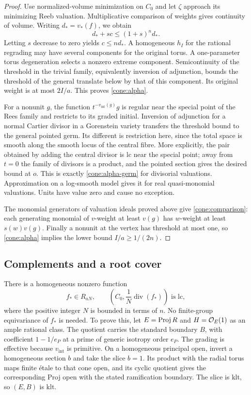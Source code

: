 \begin{proof}
Use normalized-volume minimization on $C_0$ and let $\zeta$ approach its
minimizing Reeb valuation.  Multiplicative comparison of weights gives
continuity of volume.  Writing $d_*=v_*(f)$, we obtain
\[
 d_*+sc\leq(1+s)^n d_*.
\]
Letting $s$ decrease to zero yields $c\leq nd_*$.  A homogeneous $h_I$
for the rational regrading may have several components for the original
torus.  A one-parameter torus degeneration selects a nonzero extreme
component.  Semicontinuity of the threshold in the trivial family,
equivalently inversion of adjunction, bounds the threshold of the
general translate below by that of this component.  Its original weight
is at most $2I/a$.  This proves \eqref{cone:alpha}.

For a nonunit $g$, the function
$t^{-v_{\mathrm{int}}(g)}g$ is regular near the special point of the
Rees family and restricts to its graded initial.  Inversion of
adjunction for a normal Cartier divisor in a Gorenstein variety
\cite{KawakitaInversion} transfers the threshold bound to the general
pointed germ.  Its different is restriction here, since the total space
is smooth along the smooth locus of the central fibre.  More explicitly,
the pair obtained by adding the central divisor is lc near the special
point; away from $t=0$ the family of divisors is a product, and the
pointed section gives the desired bound at $o$.  This is exactly
\eqref{cone:alpha-germ} for divisorial valuations.  Approximation on a
log-smooth model gives it for real quasi-monomial valuations.  Units
have value zero and cause no exception.

The monomial generators of valuation ideals proved above give
\eqref{cone:comparison}: each generating monomial of $v$-weight at least
$v(g)$ has $w$-weight at least $s(w)v(g)$.  Finally a nonunit at the
vertex has threshold at most one, so \eqref{cone:alpha} implies the
lower bound $I/a\geq1/(2n)$.
\end{proof}

\subsection{Complements and a root cover}

There is a homogeneous nonzero function
\begin{equation}\label{cone:complement-section}
 f_*\in R_{aN},\qquad
 \left(C_0,\frac1N\operatorname{div}(f_*)\right)\text{ is lc},
\end{equation}
where the positive integer $N$ is bounded in terms of $n$.
No finite-group equivariance of $f_*$ is needed.
To prove this, let $E=\operatorname{Proj} R$ and $H=\mathcal O_E(1)$ as an ample rational
class.  The quotient carries the standard boundary $B$, with coefficient
$1-1/e_P$ at a prime of generic isotropy order $e_P$.  The grading is
effective because $v_{\mathrm{int}}$ is primitive.  On a homogeneous
principal open, invert a homogeneous section $b$ and take the slice
$b=1$.  Its product with the radial torus maps finite \'etale to that
cone open, and its cyclic quotient gives the corresponding Proj open
with the stated ramification boundary.  The slice is klt, so $(E,B)$
is klt.

